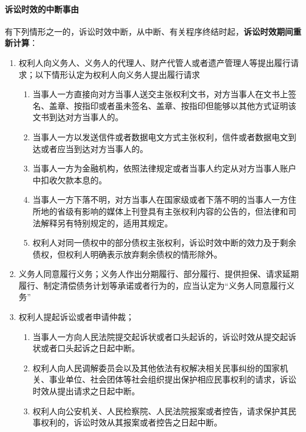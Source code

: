 \documentclass[UTF8,12pt]{ctexart}
\numberwithin{equation}{section} %
\numberwithin{figure}{section}
\numberwithin{table}{section}
\begin{document}
	\paragraph{诉讼时效的中断事由}
	有下列情形之一的，诉讼时效中断，从中断、有关程序终结时起，\textbf{诉讼时效期间重新计算}：
	\begin{enumerate}
		\item 权利人向义务人、义务人的代理人、财产代管人或者遗产管理人等提出履行请求；以下情形认定为权利人向义务人提出履行请求
		\begin{enumerate}
			\item 当事人一方直接向对方当事人送交主张权利文书，对方当事人在文书上签名、盖章、按指印或者虽未签名、盖章、按指印但能够以其他方式证明该文书到达对方当事人的。
			
			\item 当事人一方以发送信件或者数据电文方式主张权利，信件或者数据电文到达或者应当到达对方当事人的。
			
			\item 当事人一方为金融机构，依照法律规定或者当事人约定从对方当事人账户中扣收欠款本息的。
			
			\item 当事人一方下落不明，对方当事人在国家级或者下落不明的当事人一方住所地的省级有影响的媒体上刊登具有主张权利内容的公告的，但法律和司法解释另有特别规定的，适用其规定。
			
			\item 权利人对同一债权中的部分债权主张权利，诉讼时效中断的效力及于剩余债权，但权利人明确表示放弃剩余债权的情形除外。
		\end{enumerate}
		
		
		\item 义务人同意履行义务；义务人作出分期履行、部分履行、提供担保、请求延期履行、制定清偿债务计划等承诺或者行为的，应当认定为“义务人同意履行义务”
		
		\item 权利人提起诉讼或者申请仲裁；
		\begin{enumerate}
			\item 当事人一方向人民法院提交起诉状或者口头起诉的，诉讼时效从提交起诉状或者口头起诉之日起中断。
			
			\item 权利人向人民调解委员会以及其他依法有权解决相关民事纠纷的国家机关、事业单位、社会团体等社会组织提出保护相应民事权利的请求，诉讼时效从提出请求之日起中断。
			
			\item 权利人向公安机关、人民检察院、人民法院报案或者控告，请求保护其民事权利的，诉讼时效从其报案或者控告之日起中断。
			

\end{enumerate}
\end{enumerate}
\end{document}
